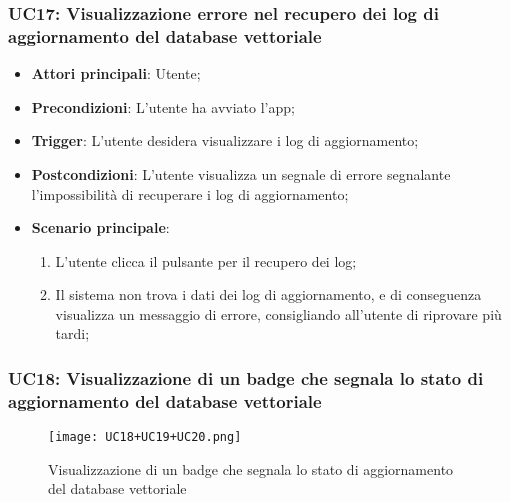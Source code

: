 \subsubsection{UC17: Visualizzazione errore nel recupero dei log di aggiornamento del database vettoriale}
\begin{itemize}
    \item \textbf{Attori principali}: Utente;
    \item \textbf{Precondizioni}: L'utente ha avviato l'app;
    \item \textbf{Trigger}: L'utente desidera visualizzare i log di aggiornamento;
    \item \textbf{Postcondizioni}: L'utente visualizza un segnale di errore segnalante l'impossibilità di recuperare i log di aggiornamento;
    \item \textbf{Scenario principale}:
    \begin{enumerate}
        \item L'utente clicca il pulsante per il recupero dei log;
        \item Il sistema non trova i dati dei log di aggiornamento, e di conseguenza visualizza un messaggio di errore, consigliando all'utente di riprovare più tardi;
    \end{enumerate}
\end{itemize}

\newpage

\hypertarget{UC18}{}
\subsubsection{UC18: Visualizzazione di un badge che segnala lo stato di aggiornamento del database vettoriale}

\begin{figure}[h]
    \centering
    \texttt{[image: UC18+UC19+UC20.png]}
    \caption{Visualizzazione di un badge che segnala lo stato di aggiornamento del database vettoriale}
\end{figure}

